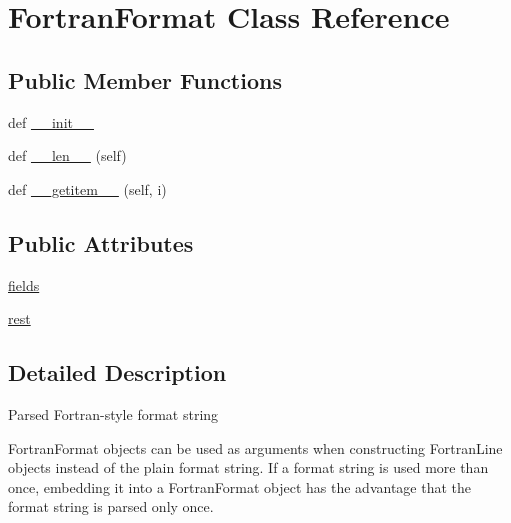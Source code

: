 \hypertarget{classpyneb_1_1utils_1_1_fortran_format_1_1_fortran_format}{}\section{Fortran\+Format Class Reference}
\label{classpyneb_1_1utils_1_1_fortran_format_1_1_fortran_format}
\subsection*{Public Member Functions}
\begin{DoxyCompactItemize}
\item 
def \hyperlink{classpyneb_1_1utils_1_1_fortran_format_1_1_fortran_format_ac775ee34451fdfa742b318538164070e}{\+\_\+\+\_\+init\+\_\+\+\_\+}
\item 
def \hyperlink{classpyneb_1_1utils_1_1_fortran_format_1_1_fortran_format_a810fdc262754b6d21f5acd0e280d4daf}{\+\_\+\+\_\+len\+\_\+\+\_\+} (self)
\item 
def \hyperlink{classpyneb_1_1utils_1_1_fortran_format_1_1_fortran_format_af2c6b7930c773edecd6d320e4c263421}{\+\_\+\+\_\+getitem\+\_\+\+\_\+} (self, i)
\end{DoxyCompactItemize}
\subsection*{Public Attributes}
\begin{DoxyCompactItemize}
\item 
\hyperlink{classpyneb_1_1utils_1_1_fortran_format_1_1_fortran_format_a0ac22a12ba104aaad1f7652877543f3b}{fields}
\item 
\hyperlink{classpyneb_1_1utils_1_1_fortran_format_1_1_fortran_format_a9428b74721f542f400b0c97507688556}{rest}
\end{DoxyCompactItemize}


\subsection{Detailed Description}
\begin{DoxyVerb}Parsed Fortran-style format string

FortranFormat objects can be used as arguments when constructing
FortranLine objects instead of the plain format string. If a
format string is used more than once, embedding it into a FortranFormat
object has the advantage that the format string is parsed only once.
\end{DoxyVerb}
 

